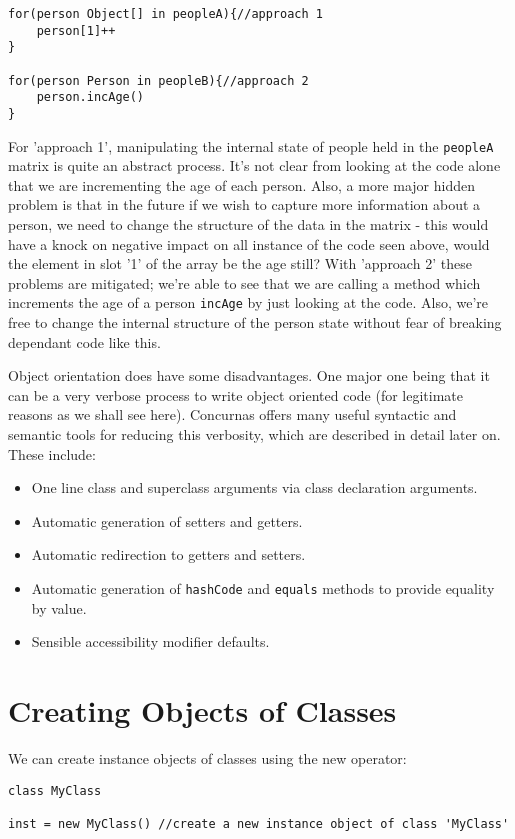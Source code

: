 \documentclass[conc-doc]{subfiles}
\begin{document}
\begin{lstlisting}
for(person Object[] in peopleA){//approach 1
	person[1]++
}

for(person Person in peopleB){//approach 2
	person.incAge()
}
\end{lstlisting}

For 'approach 1', manipulating the internal state of people held in the \lstinline{peopleA} matrix is quite an abstract process. It's not clear from looking at the code alone that we are incrementing the age of each person. Also, a more major hidden problem is that in the future if we wish to capture more information about a person, we need to change the structure of the data in the matrix - this would have a knock on negative impact on all instance of the code seen above, would the element in slot '1' of the array be the age still? With 'approach 2' these problems are mitigated; we're able to see that we are calling a method which increments the age of a person \lstinline{incAge} by just looking at the code. Also, we're free to change the internal structure of the person state without fear of breaking dependant code like this.

Object orientation does have some disadvantages. One major one being that it can be a very verbose process to write object oriented code (for legitimate reasons as we shall see here). Concurnas offers many useful syntactic and semantic tools for reducing this verbosity, which are described in detail later on. These include:
\begin{itemize}
	\item One line class and superclass arguments via class declaration arguments.
	\item Automatic generation of setters and getters.
	\item Automatic redirection to getters and setters.
	\item Automatic generation of \lstinline{hashCode} and \lstinline{equals} methods to provide equality by value.
	\item Sensible accessibility modifier defaults.
\end{itemize}

\section{Creating Objects of Classes}
We can create instance objects of classes using the new operator:

\begin{lstlisting}
class MyClass

inst = new MyClass() //create a new instance object of class 'MyClass'
\end{lstlisting}
\end{document}
